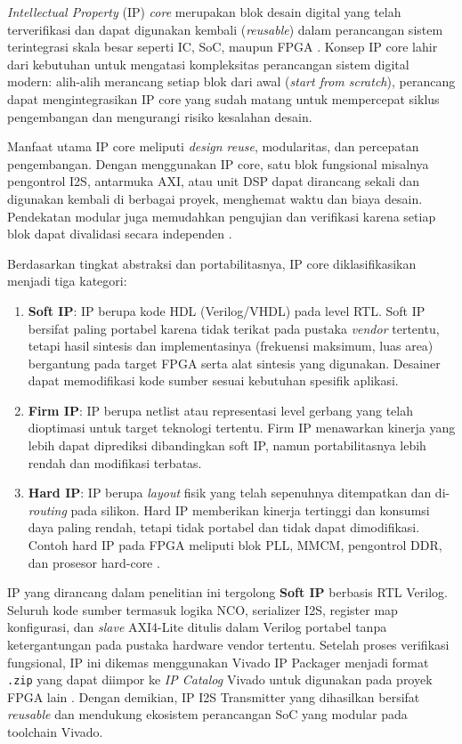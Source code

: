 \textit{Intellectual Property} (IP) \textit{core} merupakan blok desain digital yang telah terverifikasi dan dapat digunakan kembali (\textit{reusable}) dalam perancangan sistem terintegrasi skala besar seperti IC, SoC, maupun FPGA \citep{chu_fpga_prototyping_2011}. Konsep IP core lahir dari kebutuhan untuk mengatasi kompleksitas perancangan sistem digital modern: alih-alih merancang setiap blok dari awal (\textit{start from scratch}), perancang dapat mengintegrasikan IP core yang sudah matang untuk mempercepat siklus pengembangan dan mengurangi risiko kesalahan desain.

Manfaat utama IP core meliputi \textit{design reuse}, modularitas, dan percepatan pengembangan. Dengan menggunakan IP core, satu blok fungsional  misalnya pengontrol I2S, antarmuka AXI, atau unit DSP  dapat dirancang sekali dan digunakan kembali di berbagai proyek, menghemat waktu dan biaya desain. Pendekatan modular juga memudahkan pengujian dan verifikasi karena setiap blok dapat divalidasi secara independen \citep{lafosse_embedded_2018}.

Berdasarkan tingkat abstraksi dan portabilitasnya, IP core diklasifikasikan menjadi tiga kategori:
\begin{enumerate}
    \item \textbf{Soft IP}: IP berupa kode HDL (Verilog/VHDL) pada level RTL. Soft IP bersifat paling portabel karena tidak terikat pada pustaka \textit{vendor} tertentu, tetapi hasil sintesis dan implementasinya (frekuensi maksimum, luas area) bergantung pada target FPGA serta alat sintesis yang digunakan. Desainer dapat memodifikasi kode sumber sesuai kebutuhan spesifik aplikasi.
    \item \textbf{Firm IP}: IP berupa netlist atau representasi level gerbang yang telah dioptimasi untuk target teknologi tertentu. Firm IP menawarkan kinerja yang lebih dapat diprediksi dibandingkan soft IP, namun portabilitasnya lebih rendah dan modifikasi terbatas.
    \item \textbf{Hard IP}: IP berupa \textit{layout} fisik yang telah sepenuhnya ditempatkan dan di-\textit{routing} pada silikon. Hard IP memberikan kinerja tertinggi dan konsumsi daya paling rendah, tetapi tidak portabel dan tidak dapat dimodifikasi. Contoh hard IP pada FPGA meliputi blok PLL, MMCM, pengontrol DDR, dan prosesor hard-core \citep{trimberger_history_fpga_2018}.
\end{enumerate}

IP yang dirancang dalam penelitian ini tergolong \textbf{Soft IP} berbasis RTL Verilog. Seluruh kode sumber  termasuk logika NCO, serializer I2S, register map konfigurasi, dan \textit{slave} AXI4-Lite  ditulis dalam Verilog portabel tanpa ketergantungan pada pustaka hardware vendor tertentu. Setelah proses verifikasi fungsional, IP ini dikemas menggunakan Vivado IP Packager menjadi format \texttt{.zip} yang dapat diimpor ke \textit{IP Catalog} Vivado untuk digunakan pada proyek FPGA lain \citep{xilinx_ug1118}. Dengan demikian, IP I2S Transmitter yang dihasilkan bersifat \textit{reusable} dan mendukung ekosistem perancangan SoC yang modular pada toolchain Vivado.

